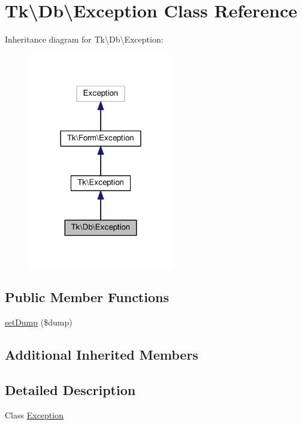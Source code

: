 \hypertarget{classTk_1_1Db_1_1Exception}{\section{Tk\textbackslash{}Db\textbackslash{}Exception Class Reference}
\label{classTk_1_1Db_1_1Exception}
}


Inheritance diagram for Tk\textbackslash{}Db\textbackslash{}Exception\+:\nopagebreak
\begin{figure}[H]
\begin{center}
\leavevmode
\includegraphics[width=180pt]{classTk_1_1Db_1_1Exception__inherit__graph}
\end{center}
\end{figure}
\subsection*{Public Member Functions}
\begin{DoxyCompactItemize}
\item 
\hyperlink{classTk_1_1Db_1_1Exception_aa129b85e66ddd994a55d253c366a6253}{set\+Dump} (\$dump)
\end{DoxyCompactItemize}
\subsection*{Additional Inherited Members}


\subsection{Detailed Description}
Class \hyperlink{classTk_1_1Db_1_1Exception}{Exception}

